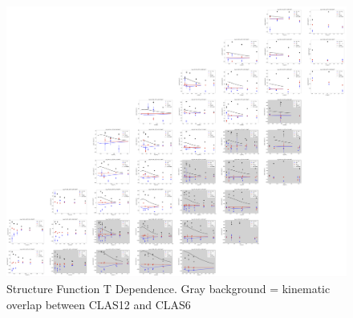 \begin{figure}[ht]
    \centering
    \includegraphics[trim={0 0 0 0},clip,angle=90,origin=c,width=\textwidth]{Chapters/Ch4-BaseAnalysis/bin_by_bin_cross_sections/t_dep_small_scale.png}
    \caption[T Dependence]{Structure Function T Dependence. Gray background = kinematic overlap between CLAS12 and CLAS6}
    \label{fig:t_dependence}
\end{figure}
